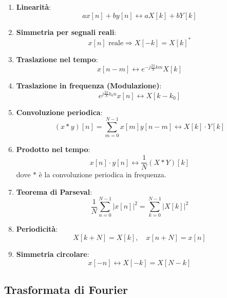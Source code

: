 \documentclass{article}
\theoremstyle{definition}
\begin{document}
	\begin{enumerate}
		\item \textbf{Linearità}:
		\[
		a x[n] + b y[n] \leftrightarrow a X[k] + b Y[k]
		\]
		
		\item \textbf{Simmetria per segnali reali}:
		\[
		x[n] \text{ reale} \Rightarrow X[-k] = X[k]^*
		\]
		
		\item \textbf{Traslazione nel tempo}:
		\[
		x[n - m] \leftrightarrow e^{-j \frac{2\pi}{N} k m} X[k]
		\]
		
		\item \textbf{Traslazione in frequenza (Modulazione)}:
		\[
		e^{j \frac{2\pi}{N} k_0 n} x[n] \leftrightarrow X[k - k_0]
		\]
		
		\item \textbf{Convoluzione periodica}:
		\[
		(x \ast y)[n] = \sum_{m=0}^{N-1} x[m] y[n - m] \leftrightarrow X[k] \cdot Y[k]
		\]
		
		\item \textbf{Prodotto nel tempo}:
		\[
		x[n] \cdot y[n] \leftrightarrow \frac{1}{N} (X \ast Y)[k]
		\]
		dove \(\ast\) è la convoluzione periodica in frequenza.
		
	
		
		\item \textbf{Teorema di Parseval}:
		\[
		\frac{1}{N} \sum_{n=0}^{N-1} |x[n]|^2 = \sum_{k=0}^{N-1} |X[k]|^2
		\]
		
		\item \textbf{Periodicità}:
		\[
		X[k + N] = X[k], \quad x[n + N] = x[n]
		\]
		
		\item \textbf{Simmetria circolare}:
		\[
		x[-n] \leftrightarrow X[-k] = X[N - k]
		\]
	\end{enumerate}
	\newpage
	\subsection{Trasformata di Fourier }
\end{document}
